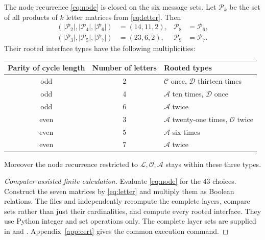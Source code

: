 \begin{proposition}\label{prop:closure}
The node recurrence \eqref{eq:node} is closed on the six message sets.
Let $\mathcal P_k$ be the set of all products of $k$ letter matrices
from \eqref{eq:letter}.  Then
\begin{align*}
 (|\mathcal P_2|,|\mathcal P_4|,|\mathcal P_6|)&=(14,11,2),&
 \mathcal P_8&=\mathcal P_6,\\
 (|\mathcal P_3|,|\mathcal P_5|,|\mathcal P_7|)&=(23,6,2),&
 \mathcal P_9&=\mathcal P_7.
\end{align*}
Their rooted interface types have the following multiplicities:
\begin{center}
\begin{tabular}{ccl}
\toprule
Parity of cycle length&Number of letters&Rooted types\\
\midrule
odd&2&$\mathcal C$ once, $\mathcal D$ thirteen times\\
odd&4&$\mathcal A$ ten times, $\mathcal D$ once\\
odd&6&$\mathcal A$ twice\\
even&3&$\mathcal A$ twenty-one times, $\mathcal O$ twice\\
even&5&$\mathcal A$ six times\\
even&7&$\mathcal A$ twice\\
\bottomrule
\end{tabular}
\end{center}
Moreover the node recurrence restricted to
$\mathcal L,\mathcal O,\mathcal A$ stays within these three types.
\end{proposition}
\begin{proof}[Computer-assisted finite calculation]
Evaluate \eqref{eq:node} for the 43 choices.  Construct the seven
matrices by \eqref{eq:letter} and multiply them as Boolean relations.
The files  and
 independently recompute the
complete layers, compare sets rather than just their cardinalities,
and compute every rooted interface.  They use Python integer and set
operations only.  The complete layer sets are supplied in
 and
.  Appendix~\ref{app:cert}
gives the common execution command.
\end{proof}

